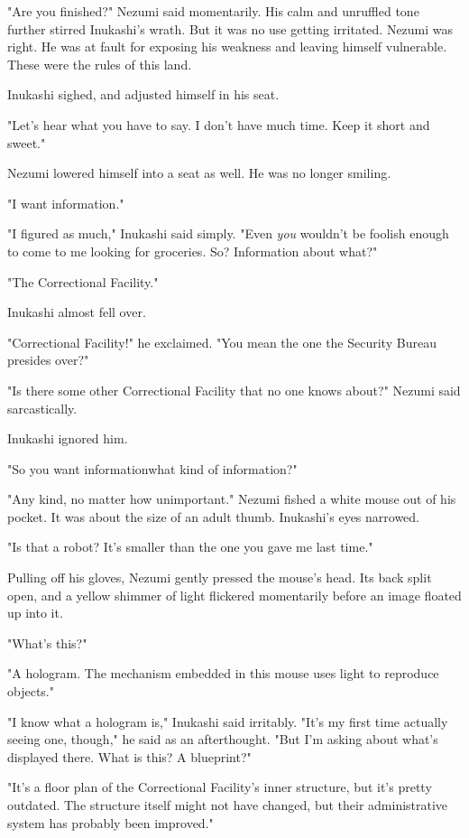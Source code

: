 "Are you finished?" Nezumi said momentarily. His calm and unruffled tone
further stirred Inukashi's wrath. But it was no use getting irritated.
Nezumi was right. He was at fault for exposing his weakness and leaving
himself vulnerable. These were the rules of this land.

Inukashi sighed, and adjusted himself in his seat.

"Let's hear what you have to say. I don't have much time. Keep it short
and sweet."

Nezumi lowered himself into a seat as well. He was no longer smiling.

"I want information."

"I figured as much," Inukashi said simply. "Even \emph{you} wouldn't be foolish
enough to come to me looking for groceries. So? Information about what?"

"The Correctional Facility."

Inukashi almost fell over.

"Correctional Facility!" he exclaimed. "You mean the one the Security
Bureau presides over?"

"Is there some other Correctional Facility that no one knows about?"
Nezumi said sarcastically.

Inukashi ignored him.

"So you want information\el what kind of information?"

"Any kind, no matter how unimportant." Nezumi fished a white mouse out
of his pocket. It was about the size of an adult thumb. Inukashi's eyes
narrowed.

"Is that a robot? It's smaller than the one you gave me last time."

Pulling off his gloves, Nezumi gently pressed the mouse's head. Its back
split open, and a yellow shimmer of light flickered momentarily before
an image floated up into it.

"What's this?"

"A hologram. The mechanism embedded in this mouse uses light to
reproduce objects."

"I know what a hologram is," Inukashi said irritably. "It's my first
time actually seeing one, though," he said as an afterthought. "But I'm
asking about what's displayed there. What is this? A blueprint?"

"It's a floor plan of the Correctional Facility's inner structure, but
it's pretty outdated. The structure itself might not have changed, but
their administrative system has probably been improved."

